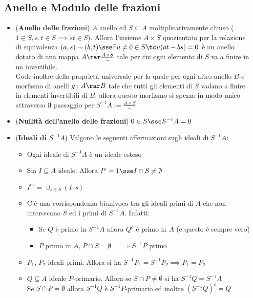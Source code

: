 \documentclass[a4paper,NoNotes,GeneralMath]{stdmdoc}
\begin{document}
	\subsection*{Anello e Modulo delle frazioni}
	\begin{itemize}
		\item ({\bf Anello delle frazioni}) $A$ anello ed $S \subseteq A$ moltiplicativamente chiuso ($1 \in S, s,t \in S \implies st \in S$). Allora l'insieme $A \times S$ quozientato per la relazione di equivalenza $(a, s) \sim (b, t) \sse \exists u \neq 0 \in S \tc u (at - bs) = 0$ è un anello dotato di una mappa $A \rar \frac{A \times S}{\sim}$ tale per cui ogni elemento di $S$ va a finire in un invertibile. \\
		Gode inoltre della proprietà universale per la quale per ogni altro anello $B$ e morfismo di anelli $g: A \rar B$ tale che tutti gli elementi di $S$ vadano a finire in elementi invertibili di $B$, allora questo morfismo si spezza in modo unico attraverso il passaggio per $S^{-1}A := \frac{A \times S}{\sim}$
		\item ({\bf Nullità dell'anello delle frazioni}) $0 \in S \sse S^{-1}A = 0$
		\item ({\bf Ideali di $S^{-1}A$}) Valgono le seguenti affermazioni sugli ideali di $S^{-1}A$:
			\begin{itemize}
				\item Ogni ideale di $S^{-1}A$ è un ideale esteso
				\item Sia $I \subseteq A$ ideale. Allora $I^e = 1 \sse I \cap S \neq \emptyset$
				\item $I^{ec} = \cup_{s \in S} (I : s)$
				\item C'è una corrispondenza biunivoca tra gli ideali primi di $A$ che non intersecano $S$ ed i primi di $S^{-1}A$. Infatti:
					\begin{itemize}
						\item Se $Q$ è primo in $S^{-1}A$ allora $Q^c$ è primo in $A$ (e questo è sempre vero)
						\item $P$ primo in $A$, $P \cap S = \emptyset \quad \implies S^{-1}P$ primo
					\end{itemize}
				\item $P_1$, $P_2$ ideali primi. Allora si ha $S^{-1}P_1 = S^{-1}P_2 \implies P_1 = P_2$
				\item $Q \subseteq A$ ideale $P$-primario. Allora se $S \cap P \neq \emptyset$ si ha $S^{-1}Q = S^{-1}A$ \\
					Se $S \cap P = \emptyset$ allora $S^{-1}Q$ è $S^{-1}P$-primario ed inoltre $(S^{-1}Q)^c = Q$

\end{itemize}
\end{itemize}
\end{document}
